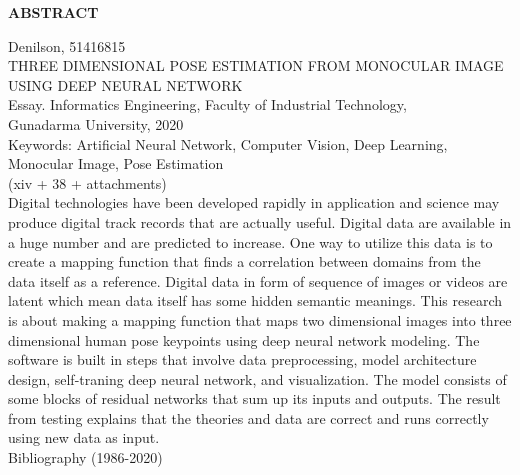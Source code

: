 \newpage %
\begin{center}
    \begin{large}\textbf{ABSTRACT}\end{large}
\end{center}

\vspace{5mm}

\noindent Denilson, 51416815 \\
THREE DIMENSIONAL POSE ESTIMATION FROM MONOCULAR IMAGE USING DEEP NEURAL NETWORK\\
Essay. Informatics Engineering, Faculty of Industrial Technology, \\
Gunadarma University, 2020\\
Keywords: Artificial Neural Network, Computer Vision, Deep Learning, Monocular Image, Pose Estimation\\
\noindent (xiv + 38 + attachments)\\

Digital technologies have been developed rapidly in application and science may produce digital track
records that are actually useful. Digital data are available in a huge number and are predicted to increase.
One way to utilize this data is to create a mapping function that finds a correlation between domains
from the data itself as a reference. Digital data in form of sequence of images or videos are latent
which mean data itself has some hidden semantic meanings. This research is about making a mapping
function that maps two dimensional images into three dimensional human pose keypoints using
deep neural network modeling. The software is built in steps that involve data preprocessing,
model architecture design, self-traning deep neural network, and visualization. The model consists of
some blocks of residual networks that sum up its inputs and outputs. The result from testing explains
that the theories and data are correct and runs correctly using new data as input.\\

\noindent Bibliography (1986-2020)